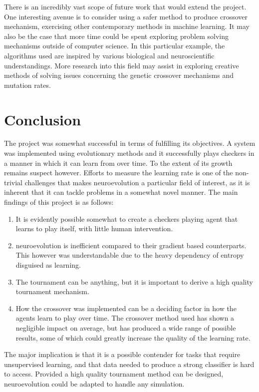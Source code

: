 \documentclass[12pt,a4paper]{article}
\begin{document}
        There is an incredibly vast scope of future work that would extend the project. One interesting avenue is to consider using a safer method to produce crossover mechanism, exercising other contemporary methods in machine learning. It may also be the case that more time could be spent exploring problem solving mechanisms  outside of computer science. In this particular example, the algorithms used are inspired by various biological and neuroscientific understandings. More research into this field may assist in exploring creative methods of solving issues concerning the genetic crossover mechanisms and mutation rates.
    


\section{Conclusion}

    The project was somewhat successful in terms of fulfilling its objectives. A system was implemented using evolutionary methods and it successfully plays checkers in a manner in which it can learn from over time. To the extent of its growth remains suspect however. Efforts to measure the learning rate is one of the non-trivial challenges that makes neuroevolution a particular field of interest, as it is inherent that it can tackle problems in a somewhat novel manner. The main findings of this project is as follows:
    \begin{enumerate}
    \item It is evidently possible somewhat to create a checkers playing agent that learns to play itself, with little human intervention.
    \item  neuroevolution is inefficient compared to their gradient based counterparts. This however was understandable due to the heavy dependency of entropy disguised as learning.
    \item  The tournament can be anything, but it is important to derive a high quality tournament mechanism.
    \item How the crossover was implemented can be a deciding factor in how the agents learn to play over time. The crossover method used has shown a negligible impact on average, but has produced a wide range of possible results, some of which could greatly increase the quality of the learning rate.
    \end{enumerate}

    The major implication is that it is a possible contender for tasks that require unsupervised learning, and that data needed to produce a strong classifier is hard to access. Provided a high quality tournament method can be designed, neuroevolution could be adapted to handle any simulation.


\end{document}
